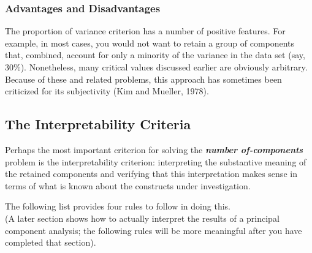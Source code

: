 \documentclass[]{article}
\begin{document}
\subsubsection{Advantages and Disadvantages}

The proportion of variance criterion has a number of positive features.  For example, in most
cases, you would not want to retain a group of components that, combined, account for only a
minority of the variance in the data set (say, $30\%$).  Nonetheless, many critical values discussed
earlier are obviously arbitrary.  Because of these and related problems, this approach has sometimes been
criticized for its subjectivity (Kim and Mueller, 1978).

\subsection{The Interpretability Criteria}

Perhaps the most important criterion for solving the \textbf{\emph{number of-components}} problem is the interpretability criterion:  interpreting the substantive meaning of the retained components and verifying that this interpretation makes sense in terms of what is known about the constructs under investigation.


The following list provides four rules to follow in doing this. \\ (A later section shows how to
actually interpret the results of a principal component analysis; the following rules will be more
meaningful after you have completed that section).
\end{document}
